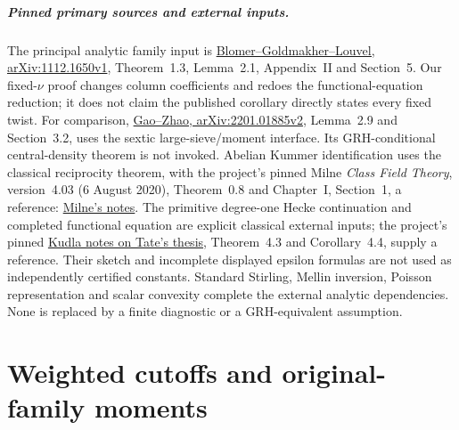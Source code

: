 \documentclass[11pt,oneside,openany]{book}
\theoremstyle{definition}\newtheorem{definition}[theorem]{Definition}
\theoremstyle{remark}\newtheorem{remark}[theorem]{Remark}
\begin{document}
\paragraph{Pinned primary sources and external inputs.}
The principal analytic family input is
\href{https://arxiv.org/pdf/1112.1650v1}{Blomer--Goldmakher--Louvel,
arXiv:1112.1650v1}, Theorem~1.3, Lemma~2.1, Appendix~II and Section~5.
Our fixed-$\nu$ proof changes column coefficients and redoes the
functional-equation reduction; it does not claim the published
corollary directly states every fixed twist.
For comparison,
\href{https://arxiv.org/pdf/2201.01885v2}{Gao--Zhao,
arXiv:2201.01885v2}, Lemma~2.9 and Section~3.2, uses the sextic
large-sieve/moment interface. Its GRH-conditional central-density theorem
is not invoked. Abelian Kummer identification uses the classical
reciprocity theorem, with the project's pinned Milne \emph{Class Field
Theory}, version~4.03 (6 August 2020), Theorem~0.8 and Chapter~I,
Section~1, a reference:
\href{https://www.jmilne.org/math/CourseNotes/CFT.pdf}{Milne's notes}.
The primitive degree-one Hecke continuation and completed functional
equation are explicit classical external inputs; the project's pinned
\href{https://u.cs.biu.ac.il/~reznikov/courses/kudla-1.pdf}{Kudla notes
on Tate's thesis}, Theorem~4.3 and Corollary~4.4, supply a reference.
Their sketch and incomplete displayed epsilon formulas are not used as
independently certified constants. Standard Stirling, Mellin inversion,
Poisson representation and scalar convexity complete the external
analytic dependencies. None is replaced by a finite diagnostic or a
GRH-equivalent assumption.


\chapter{Weighted cutoffs and original-family moments}
\end{document}
